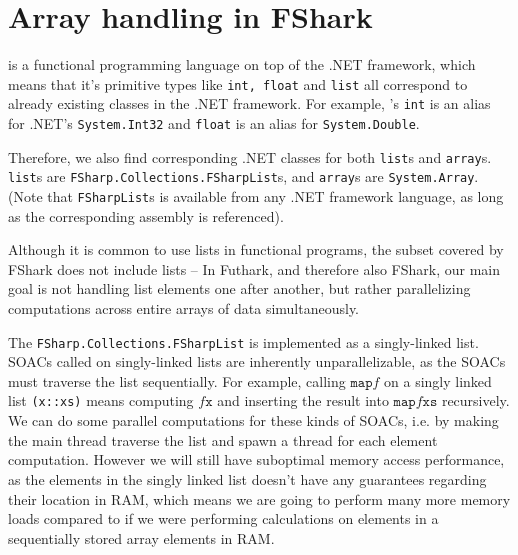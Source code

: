 \chapter{Array handling in FShark}
\fsharp{} is a functional programming language on top of the .NET framework, which
means that it's primitive types like \texttt{int, float} and \texttt{list} all
correspond to already existing classes in the .NET framework. For example,
\fsharp{}'s \texttt{int} is an alias for .NET's \texttt{System.Int32} and
\texttt{float} is an alias for \texttt{System.Double}.

Therefore, we also find corresponding .NET classes for both \fsharp{}
\texttt{list}s and \texttt{array}s. \texttt{list}s are
\texttt{FSharp.Collections.FSharpList}s, and \texttt{array}s are
\texttt{System.Array}. (Note that \texttt{FSharpList}s is available from any
.NET framework language, as long as the corresponding assembly is referenced).

Although it is common to use lists in functional programs, the \fsharp{} subset
covered by FShark does not include lists -- In Futhark, and therefore also
FShark, our main goal is not handling list elements one after another, but
rather parallelizing computations across entire arrays of data simultaneously.

The \texttt{FSharp.Collections.FSharpList} is implemented as a singly-linked
list. SOACs called on singly-linked lists are inherently unparallelizable, as
the SOACs must traverse the list sequentially.
For example, calling $\texttt{map} f$ on a singly linked list \texttt{(x::xs)}
means computing $f \texttt{x}$ and inserting the result into $\texttt{map} f
\texttt{xs}$ recursively. We can do some parallel computations for these kinds
of SOACs, i.e. by making the main thread traverse the list and spawn
a thread for each element computation. However we will still have suboptimal
memory access performance, as the elements in the singly linked list doesn't
have any guarantees regarding their location in RAM, which means we are going to
perform many more memory loads compared to if we were performing calculations on
elements in a sequentially stored array elements in RAM.











